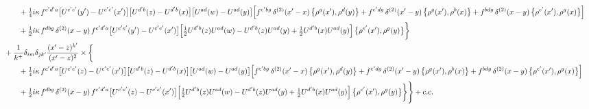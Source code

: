 \documentclass[10pt]{article}
\numberwithin{equation}{section}
\begin{document}
\begin{align}
&\qquad\quad+\tfrac14 i\kappa\,f^{c^{\prime}d^{\prime}a}\big[U^{c^{\prime}e^{\prime}}(y^{\prime})-U^{c^{\prime}e^{\prime}}(x^{\prime})\big]\big[U^{d^{\prime}b}(z)-U^{d^{\prime}b}(x)\big]\big[U^{ad}(w)-U^{ad}(y)\big]\Big[f^{e^{\prime}bg}\,\delta^{(2)}(x^{\prime}-x)\,\big\{\rho^{g}(x^{\prime}),\rho^{d}(y)\big\}+f^{e^{\prime}dg}\,\delta^{(2)}(x^{\prime}-y)\,\big\{\rho^{g}(x^{\prime}),\rho^{b}(x)\big\}+f^{bdg}\,\delta^{(2)}(x-y)\,\big\{\rho^{e^{\prime}}(x^{\prime}),\rho^{g}(x)\big\}\Big]\notag\\
&\qquad\quad+\tfrac12 i\kappa\,f^{dbg}\,\delta^{(2)}(x-y)\,f^{c^{\prime}d^{\prime}a}\big[U^{c^{\prime}e^{\prime}}(y^{\prime})-U^{c^{\prime}e^{\prime}}(x^{\prime})\big]\Big[\tfrac12U^{d^{\prime}b}(z)U^{ad}(w)-U^{d^{\prime}b}(z)U^{ad}(y)+\tfrac12U^{d^{\prime}b}(x)U^{ad}(y)\Big]\,\big\{\rho^{e^{\prime}}(x^{\prime}),\rho^{g}(y)\big\}\bigg\}\notag\\
&\quad+\frac{1}{k^{+}}\delta_{im}\delta_{jk^{\prime}}\frac{(x^{\prime}-z)^{k^{\prime}}}{(x^{\prime}-z)^{2}}\times\bigg\{\notag\\
&\qquad\quad+\tfrac14 i\kappa\,f^{c^{\prime}d^{\prime}a}\big[U^{c^{\prime}e^{\prime}}(z)-U^{c^{\prime}e^{\prime}}(x^{\prime})\big]\big[U^{d^{\prime}b}(z)-U^{d^{\prime}b}(x)\big]\big[U^{ad}(w)-U^{ad}(y)\big]\Big[f^{e^{\prime}bg}\,\delta^{(2)}(x^{\prime}-x)\,\big\{\rho^{g}(x^{\prime}),\rho^{d}(y)\big\}+f^{e^{\prime}dg}\,\delta^{(2)}(x^{\prime}-y)\,\big\{\rho^{g}(x^{\prime}),\rho^{b}(x)\big\}+f^{bdg}\,\delta^{(2)}(x-y)\,\big\{\rho^{e^{\prime}}(x^{\prime}),\rho^{g}(x)\big\}\Big]\notag\\
&\qquad\quad+\tfrac12 i\kappa\,f^{dbg}\,\delta^{(2)}(x-y)\,f^{c^{\prime}d^{\prime}a}\big[U^{c^{\prime}e^{\prime}}(z)-U^{c^{\prime}e^{\prime}}(x^{\prime})\big]\Big[\tfrac12U^{d^{\prime}b}(z)U^{ad}(w)-U^{d^{\prime}b}(z)U^{ad}(y)+\tfrac12U^{d^{\prime}b}(x)U^{ad}(y)\Big]\,\big\{\rho^{e^{\prime}}(x^{\prime}),\rho^{g}(y)\big\}\bigg\}\Bigg\}+{\rm c.c.}
\end{align}
\end{document}
